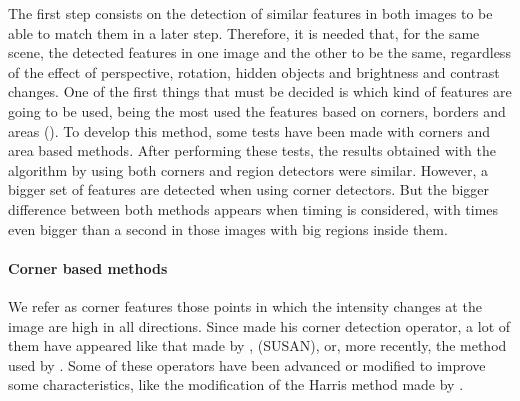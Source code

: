 The first step consists on the detection of similar features in both images to be able to match them in a later step. Therefore, it is needed that, for the same scene, the detected features in one image and the other to be the same, regardless of the effect of perspective, rotation, hidden objects and brightness and contrast changes. One of the first things that must be decided is which kind of features are going to be used, being the most used the features based on corners, borders and areas (\cite{li2008comprehensive}). To develop this method, some tests have been made with corners and area based methods. After performing these tests, the results obtained with the algorithm by using both corners and region detectors were similar. However, a bigger set of features are detected when using corner detectors. But the bigger difference between both methods appears when timing is considered, with times even bigger than a second in those images with big regions inside them.

\paragraph{Corner based methods}\label{ch:chapter01_01_02_01_01}

We refer as corner features those points in which the intensity changes at the image are high in all directions. Since \cite{hans1977towards} made his corner detection operator, a lot of them have appeared like that made by \cite{harris1988combined}, \cite{smith1997susan} (SUSAN), or, more recently, the method used by \cite{rosten2006machine}. Some of these operators have been advanced or modified to improve some characteristics, like the modification of the Harris method made by \cite{shi1994good}.

